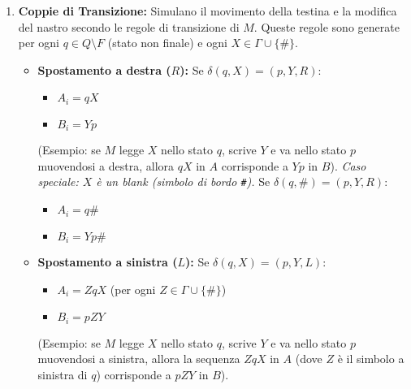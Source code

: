 \documentclass[a4paper]{article}
\theoremstyle{definition} %
\theoremstyle{remark} %
\begin{document}
\begin{enumerate}
    \item \textbf{Coppie di Transizione:}
    Simulano il movimento della testina e la modifica del nastro secondo le regole di transizione di $M$. Queste regole sono generate per ogni $q \in Q \setminus F$ (stato non finale) e ogni $X \in \Gamma \cup \{\#\}$.
    \begin{itemize}
        \item \textbf{Spostamento a destra ($R$):} Se $\delta(q, X) = (p, Y, R)$:
            \begin{itemize}
                \item $A_i = qX$
                \item $B_i = Yp$
            \end{itemize}
            (Esempio: se $M$ legge $X$ nello stato $q$, scrive $Y$ e va nello stato $p$ muovendosi a destra, allora $qX$ in $A$ corrisponde a $Yp$ in $B$).
            \emph{Caso speciale: $X$ è un blank (simbolo di bordo \texttt{\#}).} Se $\delta(q, \#) = (p, Y, R)$:
            \begin{itemize}
                \item $A_i = q\#$
                \item $B_i = Yp\#$
            \end{itemize}
        \item \textbf{Spostamento a sinistra ($L$):} Se $\delta(q, X) = (p, Y, L)$:
            \begin{itemize}
                \item $A_i = ZqX$ (per ogni $Z \in \Gamma \cup \{\#\}$)
                \item $B_i = pZY$
            \end{itemize}
            (Esempio: se $M$ legge $X$ nello stato $q$, scrive $Y$ e va nello stato $p$ muovendosi a sinistra, allora la sequenza $ZqX$ in $A$ (dove $Z$ è il simbolo a sinistra di $q$) corrisponde a $pZY$ in $B$).
    \end{itemize}


\end{enumerate}
\end{document}
